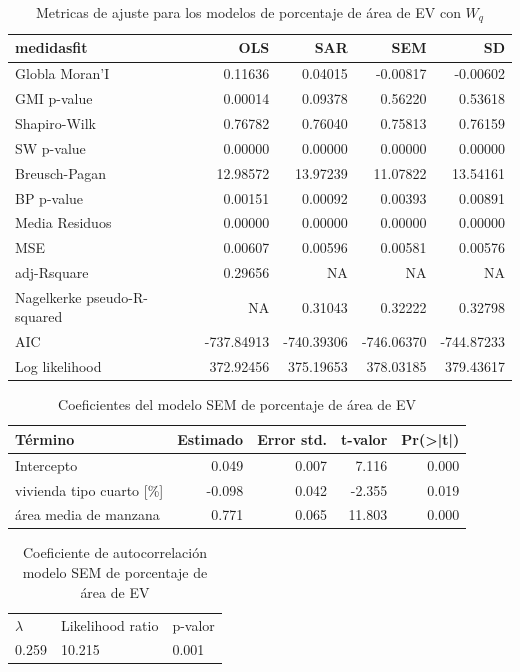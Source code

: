 \documentclass[12pt,a4paper,oneside, openany]{book}
\theoremstyle{definition}
\theoremstyle{definition}
\theoremstyle{definition}
\theoremstyle{remark}
\begin{document}
\begin{table}[H]

\caption{\label{tab:tabla-comp-modelos-areaep}Metricas de ajuste para los modelos de porcentaje de área de EV con $W_q$}
\centering
\begin{tabular}{lrrrr}
\toprule
medidasfit & OLS & SAR & SEM & SD\\
\midrule
Globla Moran'I & 0.11636 & 0.04015 & -0.00817 & -0.00602\\
GMI p-value & 0.00014 & 0.09378 & 0.56220 & 0.53618\\
Shapiro-Wilk & 0.76782 & 0.76040 & 0.75813 & 0.76159\\
SW p-value & 0.00000 & 0.00000 & 0.00000 & 0.00000\\
Breusch-Pagan & 12.98572 & 13.97239 & 11.07822 & 13.54161\\
\addlinespace
BP p-value & 0.00151 & 0.00092 & 0.00393 & 0.00891\\
Media Residuos & 0.00000 & 0.00000 & 0.00000 & 0.00000\\
MSE & 0.00607 & 0.00596 & 0.00581 & 0.00576\\
adj-Rsquare & 0.29656 & NA & NA & NA\\
Nagelkerke pseudo-R-squared & NA & 0.31043 & 0.32222 & 0.32798\\
\addlinespace
AIC & -737.84913 & -740.39306 & -746.06370 & -744.87233\\
Log likelihood & 372.92456 & 375.19653 & 378.03185 & 379.43617\\
\bottomrule
\end{tabular}
\end{table}

\begin{table}[H]

\caption{\label{tab:coef-sem-areaep}Coeficientes del modelo SEM de porcentaje de área de EV}
\centering
\begin{tabular}{lrrrr}
\toprule
Término & Estimado & Error std. & t-valor & Pr(>|t|)\\
\midrule
Intercepto & 0.049 & 0.007 & 7.116 & 0.000\\
vivienda tipo cuarto [\%] & -0.098 & 0.042 & -2.355 & 0.019\\
área media de manzana & 0.771 & 0.065 & 11.803 & 0.000\\
\bottomrule
\end{tabular}
\end{table}

\begin{table}[H]

\caption{\label{tab:cauto-sem-areaep}Coeficiente de autocorrelación modelo SEM de porcentaje de área de EV}
\centering
\begin{tabular}{lll}
\toprule
$\lambda$ & Likelihood ratio & p-valor\\
0.259 & 10.215 & 0.001\\
\bottomrule
\end{tabular}
\end{table}
\end{document}
